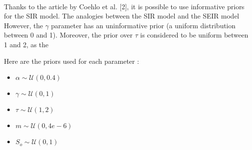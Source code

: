 \documentclass[11pt, a4paper]{article}
\begin{document}
\paragraph{}
Thanks to the article by Coehlo et al. [2], it is possible to use informative priors for the SIR model. The analogies between the SIR model and the SEIR model  However, the $\gamma$ parameter has an uninformative prior (a uniform distribution between 0 and 1). Moreover, the prior over $\tau$ is considered to be uniform between 1 and 2, as the 

Here are the priors used for each parameter : 
\begin{itemize}
\item $\alpha \sim \mathcal{U}(0, 0.4)$ 
\item $\gamma \sim \mathcal{U}(0, 1)$
\item $\tau \sim \mathcal{U}(1, 2)$
\item $m \sim  \mathcal{U}(0, 4e-6)$
\item $S_o \sim \mathcal{U}(0, 1)$
\end{itemize}
\end{document}
